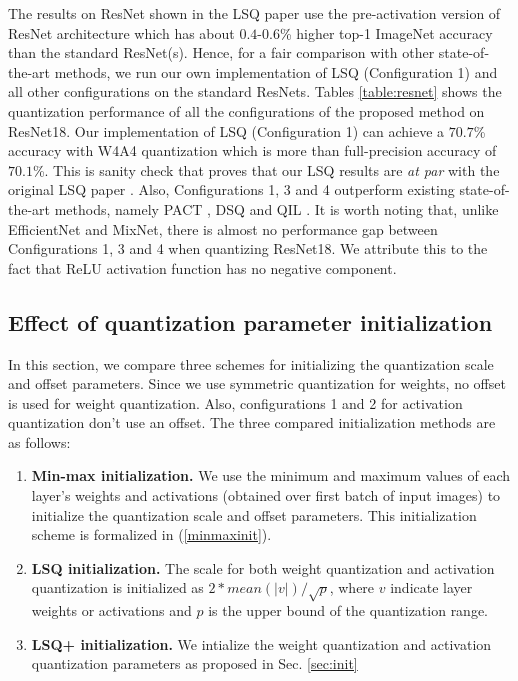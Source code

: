 \documentclass[10pt,twocolumn,letterpaper]{article}
\begin{document}
The results on ResNet shown in the LSQ paper \cite{lsq} use the pre-activation version of ResNet architecture \cite{resnet2} which has about $0.4$-$0.6$\% higher top-1 ImageNet accuracy than the standard ResNet(s). Hence, for a fair comparison with other state-of-the-art methods, we run our own implementation of LSQ (Configuration 1) and all other configurations on the standard ResNets. Tables \ref{table:resnet} shows the quantization performance of all the configurations of the proposed method on ResNet18. Our implementation of LSQ (Configuration 1) can achieve a $70.7$\% accuracy with W4A4 quantization which is more than full-precision accuracy of $70.1$\%. This is sanity check that proves that our LSQ results are \textit{at par} with the original LSQ paper \cite{lsq}. Also, Configurations 1, 3 and 4 outperform existing state-of-the-art methods, namely PACT \cite{pact2018}, DSQ \cite{dsq} and QIL \cite{qil}. It is worth noting that, unlike EfficientNet and MixNet, there is almost no performance gap between Configurations 1, 3 and 4 when quantizing ResNet18. We attribute this to the fact that ReLU activation function has no negative component.  


\subsection{Effect of quantization parameter initialization}
\label{results:init}
In this section, we compare three schemes for initializing the quantization scale and offset parameters. Since we use symmetric quantization for weights, no offset is used for weight quantization. Also, configurations 1 and 2 for activation quantization don't use an offset.
The three compared initialization methods are as follows:

\begin{enumerate}
\itemsep0pt
    \item \textbf{Min-max initialization.} We use the minimum and maximum values of each layer's weights and activations (obtained over first batch of input images) to initialize the quantization scale and offset parameters. This initialization scheme is formalized in (\ref{minmaxinit}).
    \item \textbf{LSQ initialization.} The scale for both weight quantization and activation quantization is initialized as $2*mean(|v|)/\sqrt{p}$, where $v$ indicate layer weights or activations and $p$ is the upper bound of the quantization range.
    \item \textbf{LSQ+ initialization.} We intialize the weight quantization and activation quantization parameters as proposed in Sec. \ref{sec:init}
\end{enumerate}
\end{document}
